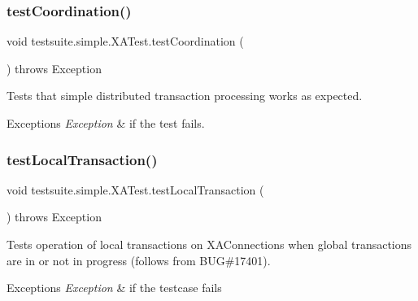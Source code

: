 \subsubsection{\texorpdfstring{test\+Coordination()}{testCoordination()}}
{\footnotesize\ttfamily void testsuite.\+simple.\+X\+A\+Test.\+test\+Coordination (\begin{DoxyParamCaption}{ }\end{DoxyParamCaption}) throws Exception}

Tests that simple distributed transaction processing works as expected.


\begin{DoxyExceptions}{Exceptions}
{\em Exception} & if the test fails. \\
\hline
\end{DoxyExceptions}
\mbox{\label{classtestsuite_1_1simple_1_1_x_a_test_aeb2dc398d807c4028e784f85aba58457}} 
\subsubsection{\texorpdfstring{test\+Local\+Transaction()}{testLocalTransaction()}}
{\footnotesize\ttfamily void testsuite.\+simple.\+X\+A\+Test.\+test\+Local\+Transaction (\begin{DoxyParamCaption}{ }\end{DoxyParamCaption}) throws Exception}

Tests operation of local transactions on X\+A\+Connections when global transactions are in or not in progress (follows from B\+UG\#17401).


\begin{DoxyExceptions}{Exceptions}
{\em Exception} & if the testcase fails \\
\hline
\end{DoxyExceptions}
\mbox{\label{classtestsuite_1_1simple_1_1_x_a_test_aa3b48d0aaeb44cc191cba70d70e16234}} 

